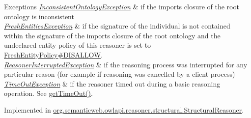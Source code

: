 \begin{DoxyExceptions}{Exceptions}
{\em \hyperlink{classorg_1_1semanticweb_1_1owlapi_1_1reasoner_1_1_inconsistent_ontology_exception}{Inconsistent\-Ontology\-Exception}} & if the imports closure of the root ontology is inconsistent \\
\hline
{\em \hyperlink{classorg_1_1semanticweb_1_1owlapi_1_1reasoner_1_1_fresh_entities_exception}{Fresh\-Entities\-Exception}} & if the signature of the individual is not contained within the signature of the imports closure of the root ontology and the undeclared entity policy of this reasoner is set to \hyperlink{enumorg_1_1semanticweb_1_1owlapi_1_1reasoner_1_1_fresh_entity_policy_a762eae6d5b2449d125311ecaabfdc8d0}{Fresh\-Entity\-Policy\#\-D\-I\-S\-A\-L\-L\-O\-W}. \\
\hline
{\em \hyperlink{classorg_1_1semanticweb_1_1owlapi_1_1reasoner_1_1_reasoner_interrupted_exception}{Reasoner\-Interrupted\-Exception}} & if the reasoning process was interrupted for any particular reason (for example if reasoning was cancelled by a client process) \\
\hline
{\em \hyperlink{classorg_1_1semanticweb_1_1owlapi_1_1reasoner_1_1_time_out_exception}{Time\-Out\-Exception}} & if the reasoner timed out during a basic reasoning operation. See \hyperlink{interfaceorg_1_1semanticweb_1_1owlapi_1_1reasoner_1_1_o_w_l_reasoner_a44b2c968f989afe5290db29c90faa164}{get\-Time\-Out()}. \\
\hline
\end{DoxyExceptions}


Implemented in \hyperlink{classorg_1_1semanticweb_1_1owlapi_1_1reasoner_1_1structural_1_1_structural_reasoner_a3428eb34655d10c9004fd47b3f4cf407}{org.\-semanticweb.\-owlapi.\-reasoner.\-structural.\-Structural\-Reasoner}.

